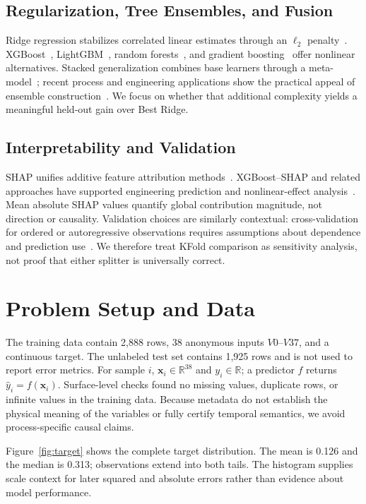 \documentclass[sigconf,screen,review,anonymous]{acmart}
\begin{document}
\subsection{Regularization, Tree Ensembles, and Fusion}
Ridge regression stabilizes correlated linear estimates through an $\ell_2$ penalty~\cite{hoerl1970ridge}. XGBoost~\cite{chen2016xgboost}, LightGBM~\cite{ke2017lightgbm}, random forests~\cite{breiman2001randomforest}, and gradient boosting~\cite{friedman2001gbdt} offer nonlinear alternatives. Stacked generalization combines base learners through a meta-model~\cite{wolpert1992stacking}; recent process and engineering applications show the practical appeal of ensemble construction~\cite{wang2019two_layer_ensemble,hu2025zju_stacking}. We focus on whether that additional complexity yields a meaningful held-out gain over Best Ridge.

\subsection{Interpretability and Validation}
SHAP unifies additive feature attribution methods~\cite{lundberg2017shap}. XGBoost--SHAP and related approaches have supported engineering prediction and nonlinear-effect analysis~\cite{chen2023zju_xgboost_shap,lu2025zju_xgboost_shap}. Mean absolute SHAP values quantify global contribution magnitude, not direction or causality. Validation choices are similarly contextual: cross-validation for ordered or autoregressive observations requires assumptions about dependence and prediction use~\cite{bergmeir2012cv,bergmeir2018cv}. We therefore treat KFold comparison as sensitivity analysis, not proof that either splitter is universally correct.

\section{Problem Setup and Data}
The training data contain 2,888 rows, 38 anonymous inputs $V0$--$V37$, and a continuous target. The unlabeled test set contains 1,925 rows and is not used to report error metrics. For sample $i$, $\mathbf{x}_i\in\mathbb{R}^{38}$ and $y_i\in\mathbb{R}$; a predictor $f$ returns $\hat y_i=f(\mathbf{x}_i)$. Surface-level checks found no missing values, duplicate rows, or infinite values in the training data. Because metadata do not establish the physical meaning of the variables or fully certify temporal semantics, we avoid process-specific causal claims.

Figure~\ref{fig:target} shows the complete target distribution. The mean is 0.126 and the median is 0.313; observations extend into both tails. The histogram supplies scale context for later squared and absolute errors rather than evidence about model performance.
\end{document}
